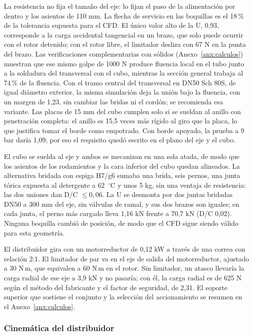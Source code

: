 La resistencia no fija el tamaño del eje: lo fijan el paso de la alimentación por dentro y los asientos de 110 mm. La flecha de servicio en las boquillas es el 18\,\% de la tolerancia supuesta para el CFD. El único valor alto de la U, 0,93, corresponde a la carga accidental tangencial en un brazo, que solo puede ocurrir con el rotor detenido; con el rotor libre, el limitador desliza con 67 N en la punta del brazo. Las verificaciones complementarias con sólidos (Anexo~\ref{anx:calculos}) muestran que ese mismo golpe de 1000 N produce fluencia local en el tubo junto a la soldadura del transversal con el cubo, mientras la sección general trabaja al 74\,\% de la fluencia. Con el tramo central del transversal en DN50 Sch 80S, de igual diámetro exterior, la misma simulación deja la unión bajo la fluencia, con un margen de 1,23, sin cambiar las bridas ni el cordón; se recomienda esa variante. Las placas de 15 mm del cubo cumplen solo si se sueldan al anillo con penetración completa: el anillo es 15,5 veces más rígido al giro que la placa, lo que justifica tomar el borde como empotrado. Con borde apoyado, la prueba a 9 bar daría 1,09; por eso el requisito quedó escrito en el plano del eje y el cubo.

El cubo se suelda al eje y ambos se mecanizan en una sola atada, de modo que los asientos de los rodamientos y la cara inferior del cubo quedan alineados. La alternativa bridada con espiga H7/g6 sumaba una brida, seis pernos, una junta tórica expuesta al detergente a 62~$^\circ$C y unos 5 kg, sin una ventaja de resistencia: las dos uniones dan D/C $\leq0{,}06$. La U se desmonta por dos juntas bridadas DN50 a 300 mm del eje, sin válvulas de ramal, y sus dos brazos son iguales; en cada junta, el perno más cargado lleva 1,16 kN frente a 70,7 kN (D/C 0,02). Ninguna boquilla cambió de posición, de modo que el CFD sigue siendo válido para esta geometría.

El distribuidor gira con un motorreductor de 0,12 kW a través de una correa con relación 2:1. El limitador de par va en el eje de salida del motorreductor, ajustado a 30 N\,m, que equivalen a 60 N\,m en el rotor. Sin limitador, un atasco llevaría la carga radial de ese eje a 3,9 kN y no pasaría; con él, la carga radial es de 625 N según el método del fabricante y el factor de seguridad, de 2,31. El soporte superior que sostiene el conjunto y la selección del accionamiento se resumen en el Anexo~\ref{anx:calculos}.

\subsubsection{Cinemática del distribuidor}


